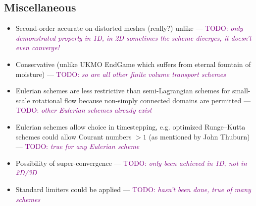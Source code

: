 \documentclass{article}
\newcommand{\TODO}[1]{\textcolor{purple}{TODO: \emph{#1}}}
\begin{document}
\subsection*{Miscellaneous}
\begin{itemize}
	\item Second-order accurate on distorted meshes (really?) unlike \citep{skamarock-gassmann2011} --- \TODO{only demonstrated properly in 1D, in 2D sometimes the scheme diverges, it doesn't even converge!}
	\item Conservative (unlike UKMO EndGame which suffers from eternal fountain of moisture) --- \TODO{so are all other finite volume transport schemes}
	\item Eulerian schemes are less restrictive than semi-Lagrangian schemes for small-scale rotational flow because non-simply connected domains are permitted \citep{lauritzen2011book} --- \TODO{other Eulerian schemes already exist}
	\item Eulerian schemes allow choice in timestepping, e.g. optimized Runge--Kutta schemes could allow Courant numbers $> 1$ (as mentioned by John Thuburn) --- \TODO{true for any Eulerian scheme}
	\item Possibility of super-convergence --- \TODO{only been achieved in 1D, not in 2D/3D}
	\item Standard limiters could be applied --- \TODO{hasn't been done, true of many schemes}
\end{itemize}




\end{document}
